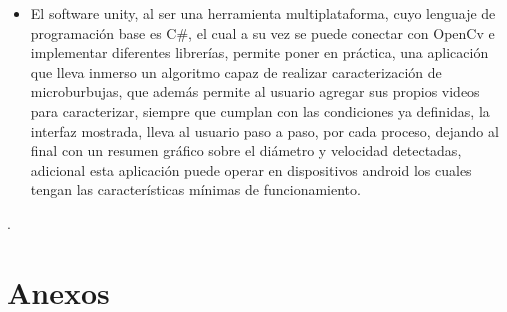 \documentclass[12pt,twocolumn,a4paper]{article}
\begin{document}
\begin{itemize}
\item El software unity, al ser una herramienta multiplataforma, cuyo lenguaje de programación base es C\#, el cual a su vez se puede conectar con OpenCv e implementar diferentes librerías, permite poner en práctica, una aplicación que lleva inmerso un algoritmo capaz de realizar caracterización de microburbujas, que además permite al usuario agregar sus propios videos para caracterizar, siempre que cumplan con las condiciones ya definidas, la interfaz mostrada, lleva al usuario paso a paso, por cada proceso, dejando al final con un resumen gráfico sobre el diámetro y velocidad detectadas, adicional esta aplicación puede operar en dispositivos android los cuales tengan las características mínimas de funcionamiento.
\end{itemize}.

\section{Anexos}




\newpage
\end{document}
